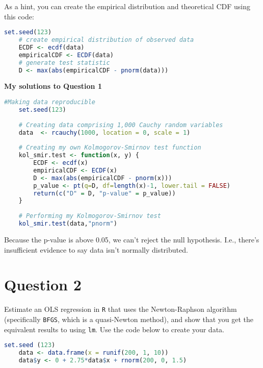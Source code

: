 \documentclass[12pt,letterpaper]{article}
\begin{document}
	
\noindent As a hint, you can create the empirical distribution and theoretical CDF using this code:

\begin{lstlisting}[language=R]
	set.seed(123)
	# create empirical distribution of observed data
	ECDF <- ecdf(data)
	empiricalCDF <- ECDF(data)
	# generate test statistic
	D <- max(abs(empiricalCDF - pnorm(data))) \end{lstlisting}

\vspace{.5in}

\textbf{My solutions to Question 1}
\vspace{.25cm}
\begin{lstlisting}[language=R]
	#Making data reproducible
	set.seed(123)
	
	# Creating data comprising 1,000 Cauchy random variables
	data  <- rcauchy(1000, location = 0, scale = 1)
	
	# Creating my own Kolmogorov-Smirnov test function
	kol_smir.test <- function(x, y) {
		ECDF <- ecdf(x)
		empiricalCDF <- ECDF(x)
		D <- max(abs(empiricalCDF - pnorm(x)))
		p_value <- pt(q=D, df=length(x)-1, lower.tail = FALSE)
		return(c("D" = D, "p-value" = p_value))
	}
	
	# Performing my Kolmogorov-Smirnov test
	kol_smir.test(data,"pnorm") \end{lstlisting}
\vspace{.25in}
Because the p-value is above 0.05, we can't reject the null hypothesis. I.e., there's insufficient evidence to say data isn't normally distributed.
\newpage
\section*{Question 2}
\noindent Estimate an OLS regression in \texttt{R} that uses the Newton-Raphson algorithm (specifically \texttt{BFGS}, which is a quasi-Newton method), and show that you get the equivalent results to using \texttt{lm}. Use the code below to create your data.
\vspace{.5cm}
\begin{lstlisting}[language=R]
	set.seed (123)
	data <- data.frame(x = runif(200, 1, 10))
	data$y <- 0 + 2.75*data$x + rnorm(200, 0, 1.5) \end{lstlisting}

\vspace{.5in}
\end{document}
